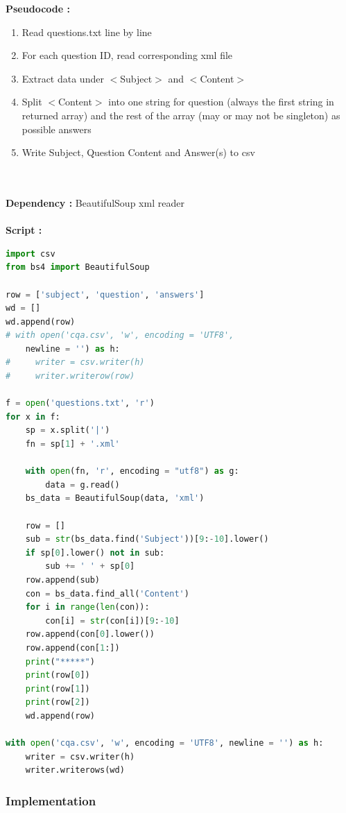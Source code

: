 \documentclass[12pt, a4paper]{article}
\begin{document}
\textbf{Pseudocode : }
\begin{enumerate}
    \item Read questions.txt line by line 
    \item For each question ID, read corresponding xml file 
    \item Extract data under \(<\)Subject\(>\) and \(<\)Content\(>\) 
    \item Split \(<\)Content\(>\) into one string for question (always the first string in returned array) and the rest of the array (may or may not be singleton) as possible answers 
    \item Write Subject, Question Content and Answer(s) to csv 
\end{enumerate}
\\~\\
\textbf{Dependency : } 
BeautifulSoup xml reader 
\\~\\
\textbf{Script : } 
\begin{lstlisting}[language = Python]
import csv 
from bs4 import BeautifulSoup 

row = ['subject', 'question', 'answers']
wd = [] 
wd.append(row)
# with open('cqa.csv', 'w', encoding = 'UTF8', 
    newline = '') as h: 
#     writer = csv.writer(h) 
#     writer.writerow(row)

f = open('questions.txt', 'r') 
for x in f: 
    sp = x.split('|') 
    fn = sp[1] + '.xml' 
    
    with open(fn, 'r', encoding = "utf8") as g:
        data = g.read() 
    bs_data = BeautifulSoup(data, 'xml') 

    row = []
    sub = str(bs_data.find('Subject'))[9:-10].lower()
    if sp[0].lower() not in sub: 
        sub += ' ' + sp[0]
    row.append(sub) 
    con = bs_data.find_all('Content')
    for i in range(len(con)): 
        con[i] = str(con[i])[9:-10]
    row.append(con[0].lower()) 
    row.append(con[1:]) 
    print("*****")
    print(row[0]) 
    print(row[1]) 
    print(row[2]) 
    wd.append(row)

with open('cqa.csv', 'w', encoding = 'UTF8', newline = '') as h: 
    writer = csv.writer(h) 
    writer.writerows(wd) 
\end{lstlisting}


\subsubsection{Implementation} 
\end{document}
